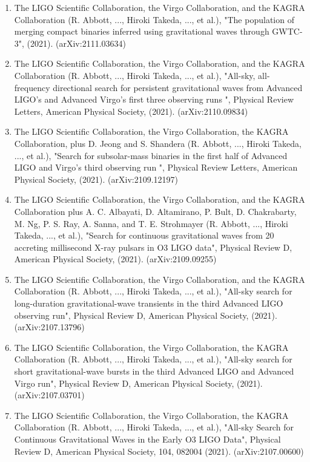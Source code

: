 \documentclass[uplatex, 12pt,a4paper]{jsarticle}
\begin{document}
\begin{enumerate}
\item The LIGO Scientific Collaboration, the Virgo Collaboration, and the KAGRA Collaboration (R. Abbott, ..., Hiroki Takeda, ..., et al.), "The population of merging compact binaries inferred using gravitational waves through GWTC-3", (2021). (arXiv:2111.03634)

\item The LIGO Scientific Collaboration, the Virgo Collaboration, and the KAGRA Collaboration (R. Abbott, ..., Hiroki Takeda, ..., et al.), "All-sky, all-frequency directional search for persistent gravitational waves from Advanced LIGO's and Advanced Virgo's first three observing runs ", Physical Review Letters, American Physical Society, (2021). (arXiv:2110.09834)

\item The LIGO Scientific Collaboration, the Virgo Collaboration, the KAGRA Collaboration, plus D. Jeong and S. Shandera (R. Abbott, ..., Hiroki Takeda, ..., et al.), "Search for subsolar-mass binaries in the first half of Advanced LIGO and Virgo's third observing run ", Physical Review Letters, American Physical Society, (2021). (arXiv:2109.12197)

\item The LIGO Scientific Collaboration, the Virgo Collaboration, and the KAGRA Collaboration plus A. C. Albayati, D. Altamirano, P. Bult, D. Chakrabarty, M. Ng, P. S. Ray, A. Sanna, and T. E. Strohmayer (R. Abbott, ..., Hiroki Takeda, ..., et al.), "Search for continuous gravitational waves from 20 accreting millisecond X-ray pulsars in O3 LIGO data", Physical Review D, American Physical Society, (2021). (arXiv:2109.09255)

\item The LIGO Scientific Collaboration, the Virgo Collaboration, and the KAGRA Collaboration (R. Abbott, ..., Hiroki Takeda, ..., et al.), "All-sky search for long-duration gravitational-wave transients in the third Advanced LIGO observing run", Physical Review D, American Physical Society, (2021). (arXiv:2107.13796)

\item The LIGO Scientific Collaboration, the Virgo Collaboration, the KAGRA Collaboration (R. Abbott, ..., Hiroki Takeda, ..., et al.), "All-sky search for short gravitational-wave bursts in the third Advanced LIGO and Advanced Virgo run", Physical Review D, American Physical Society, (2021). (arXiv:2107.03701)

\item The LIGO Scientific Collaboration, the Virgo Collaboration, the KAGRA Collaboration (R. Abbott, ..., Hiroki Takeda, ..., et al.), "All-sky Search for Continuous Gravitational Waves in the Early O3 LIGO Data", Physical Review D, American Physical Society, 104, 082004 (2021). (arXiv:2107.00600)


\end{enumerate}
\end{document}
